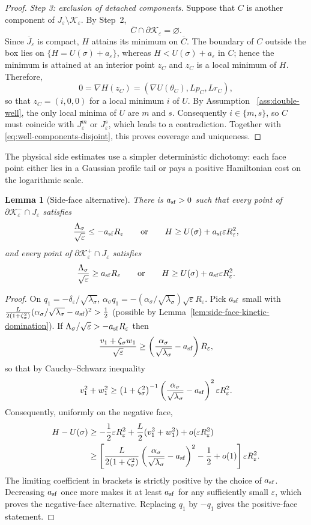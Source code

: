 \documentclass[11pt]{article}
\numberwithin{equation}{section}
\theoremstyle{plain}
\newtheorem{lemma}[theorem]{Lemma}
\theoremstyle{definition}
\theoremstyle{remark}
\newcommand{\eps}{\varepsilon}
\begin{document}
\begin{proof}
\emph{Step 3: exclusion of detached components.}
Suppose that $C$ is another component of
$J_\eps\setminus\mathcal K_\eps$.  By Step~2,
\[
\overline C\cap\partial\mathcal K_\eps=\varnothing.
\]
Since $\overline J_\eps$ is compact, $H$ attains its minimum on
$\overline C$.  The boundary of $C$ outside the box lies on
$\{H=U(\sigma)+a_\eps\}$, whereas $H<U(\sigma)+a_\eps$ in $C$; hence the
minimum is attained at an interior point $z_C$ and $z_C$ is a local minimum
of $H$. Therefore,
\[
0=\nabla H(z_C)=(\nabla U(\theta_C),Lp_C,Lr_C),
\]
so that $z_C=(i,0,0)$ for a local minimum $i$ of $U$.  By Assumption~
\ref{ass:double-well}, the only local minima of $U$ are $m$ and $s$.
Consequently $i\in\{m,s\}$, so $C$ must coincide with $J_\eps^m$ or
$J_\eps^s$, which leads to a contradiction.
Together with
\eqref{eq:well-components-disjoint}, this proves coverage and uniqueness.
\end{proof}


The physical side estimates use a simpler deterministic dichotomy: each face
point either lies in a Gaussian profile tail or pays a positive Hamiltonian
cost on the logarithmic scale.

\begin{lemma}[Side-face alternative]
\label{lem:side-face-alternative}
There is $a_{\rm sf}>0$ such that every point of
$\partial\mathcal K_\eps^-\cap J_\eps$ satisfies
\[
\frac{\Lambda_\sigma}{\sqrt\eps}\le-a_{\rm sf}R_\eps\qquad\text{or}\qquad
H\ge U(\sigma)+a_{\rm sf}\eps R_\eps^2,
\]
and every point of $\partial\mathcal K_\eps^+\cap J_\eps$ satisfies
\[
\frac{\Lambda_\sigma}{\sqrt\eps}\ge a_{\rm sf}R_\eps
\qquad\text{or}\qquad
H\ge U(\sigma)+a_{\rm sf}\eps R_\eps^2.
\]
\end{lemma}

\begin{proof}
On $q_1=-\delta_\eps/\sqrt{\lambda_\sigma}$,
$\alpha_\sigma q_1=-(\alpha_\sigma/\sqrt{\lambda_\sigma})\sqrt\eps R_\eps$.  Pick
$a_{\rm sf}$ small with
$\frac{L}{2(1+\zeta_\sigma^2)}(\alpha_\sigma/\sqrt{\lambda_\sigma}-a_{\rm sf})^2>\frac12$
(possible by Lemma~\ref{lem:side-face-kinetic-domination}).  If
$\Lambda_\sigma/\sqrt\eps>-a_{\rm sf}R_\eps$ then
\[
\frac{v_1+\zeta_\sigma w_1}{\sqrt\eps}\ge
\left(\frac{\alpha_\sigma}{\sqrt{\lambda_\sigma}}-a_{\rm sf}\right)R_\eps,
\]
so that by Cauchy--Schwarz inequality
\[
v_1^2+w_1^2\ge\left(1+\zeta_\sigma^2\right)^{-1}
\left(\frac{\alpha_\sigma}{\sqrt{\lambda_\sigma}}-a_{\rm sf}\right)^2\eps R_\eps^2.
\]
Consequently, uniformly on the negative face,
\[
\begin{aligned}
H-U(\sigma)
&\ge -\frac12\eps R_\eps^2
+\frac L2(v_1^2+w_1^2)+o(\eps R_\eps^2)\\
&\ge
\left[
\frac{L}{2(1+\zeta_\sigma^2)}
\left(\frac{\alpha_\sigma}{\sqrt{\lambda_\sigma}}-a_{\rm sf}\right)^2
-\frac12+o(1)
\right]\eps R_\eps^2.
\end{aligned}
\]
The limiting coefficient in brackets is strictly positive by the choice of
$a_{\rm sf}$.  Decreasing $a_{\rm sf}$ once more makes it at least
$a_{\rm sf}$ for any sufficiently small $\eps$, which proves the negative-face
alternative.  Replacing $q_1$ by $-q_1$ gives the positive-face statement.
\end{proof}
\end{document}
